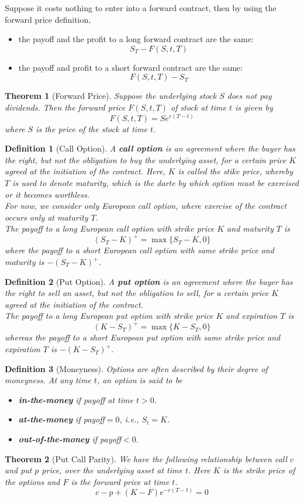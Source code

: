 \documentclass[12pt]{article}
\newtheorem{definition}{Definition}[section]
\newtheorem{theorem}{Theorem}[section]
\theoremstyle{definition}
\begin{document}
Suppose it costs nothing to enter into a forward contract, then by using the forward price definition, 
\begin{itemize}
  \item the payoff and the profit to a long forward contract are the same:
  \[
S_T-F(S, t, T)
  \]
  \item the payoff and profit to a short forward contract are the same:
  \[
F(S,t,T) - S_T
  \]
\end{itemize}
\begin{theorem}[Forward Price]
\normalfont Suppose the underlying stock $S$ does not pay dividends. Then the forward price $F(S,t, T)$ of stock at time $t$ is given by
\[
F(S,t,T) = Se^{r(T-t)}
\]
where $S$ is the price of the stock at time $t$.
\end{theorem}
\begin{definition}[Call Option]
\normalfont A \textbf{call option} is an agreement where the buyer has the \textit{right}, but not the obligation to buy the underlying asset, for a certain price $K$ agreed at the initiation of the contract. Here, $K$ is called the stike price, whereby $T$ is used to denote maturity, which is the darte by which option must be exercised or it becomes worthless. \\
For now, we consider only European call option, where exercise of the contract occurs only at maturity $T$.\\
The payoff to a long European call option with strike price $K$ and maturity $T$ is
\[
(S_T-K)^+=\max\{S_T-K,0\}
\]
where the payoff to a short European call option with same strike price and maturity is $-(S_T-K)^+$.
\end{definition}
\begin{definition}[Put Option]
\normalfont A \textbf{put option} is an agreement where the buyer has the right to sell an asset, but not the obligation to sell, for a certain price $K$ agreed at the initiation of the contract.\\
The payoff to a long European put option with strike price $K$ and expiration $T$ is
\[
(K-S_T)^+=\max\{K-S_T,0\}
\]
whereas the payoff to a short European put option with same strike price and expiration $T$ is $-(K-S_T)^+$.
\end{definition}
\begin{definition}[Moneyness]
\normalfont Options are often described by their degree of moneyness. At any time $t$, an option is said to be 
\begin{itemize}
  \item \textbf{in-the-money} if payoff at time $t>0$.
  \item \textbf{at-the-money} if payoff$=0$, i.e., $S_t=K$.
  \item \textbf{out-of-the-money} if payoff$<0$.
\end{itemize}
\end{definition}
\begin{theorem}[Put Call Parity]
\normalfont We have the following relationship between call $c$ and put $p$ price, over the underlying asset at time $t$. Here $K$ is the strike price of the options and $F$ is the forward price at time $t$.
\[
c-p+(K-F)e^{-r(T-t)}=0
\]
\end{theorem}
\end{document}
